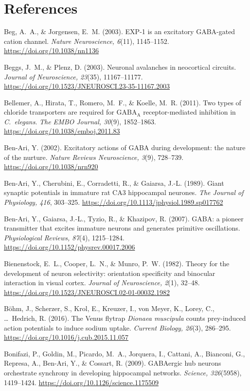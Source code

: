 \documentclass[11pt,a4paper]{article}
\newenvironment{apabib}{\raggedright\begin{list}{}{%
  \setlength{\leftmargin}{1.6em}\setlength{\itemindent}{-1.6em}%
  \setlength{\itemsep}{3pt}\setlength{\parsep}{0pt}\setlength{\topsep}{4pt}}}%
  {\end{list}}
\begin{document}
\section*{References}
\small
\begin{apabib}
\item Beg, A.~A., \& Jorgensen, E.~M. (2003). EXP-1 is an excitatory GABA-gated cation channel. \emph{Nature Neuroscience, 6}(11), 1145--1152. \url{https://doi.org/10.1038/nn1136}
\item Beggs, J.~M., \& Plenz, D. (2003). Neuronal avalanches in neocortical circuits. \emph{Journal of Neuroscience, 23}(35), 11167--11177. \url{https://doi.org/10.1523/JNEUROSCI.23-35-11167.2003}
\item Bellemer, A., Hirata, T., Romero, M.~F., \& Koelle, M.~R. (2011). Two types of chloride transporters are required for GABA$_{\mathrm{A}}$ receptor-mediated inhibition in \emph{C.~elegans}. \emph{The EMBO Journal, 30}(9), 1852--1863. \url{https://doi.org/10.1038/emboj.2011.83}
\item Ben-Ari, Y. (2002). Excitatory actions of GABA during development: the nature of the nurture. \emph{Nature Reviews Neuroscience, 3}(9), 728--739. \url{https://doi.org/10.1038/nrn920}
\item Ben-Ari, Y., Cherubini, E., Corradetti, R., \& Gaiarsa, J.-L. (1989). Giant synaptic potentials in immature rat CA3 hippocampal neurones. \emph{The Journal of Physiology, 416}, 303--325. \url{https://doi.org/10.1113/jphysiol.1989.sp017762}
\item Ben-Ari, Y., Gaiarsa, J.-L., Tyzio, R., \& Khazipov, R. (2007). GABA: a pioneer transmitter that excites immature neurons and generates primitive oscillations. \emph{Physiological Reviews, 87}(4), 1215--1284. \url{https://doi.org/10.1152/physrev.00017.2006}
\item Bienenstock, E.~L., Cooper, L.~N., \& Munro, P.~W. (1982). Theory for the development of neuron selectivity: orientation specificity and binocular interaction in visual cortex. \emph{Journal of Neuroscience, 2}(1), 32--48. \url{https://doi.org/10.1523/JNEUROSCI.02-01-00032.1982}
\item B\"ohm, J., Scherzer, S., Krol, E., Kreuzer, I., von Meyer, K., Lorey, C., \ldots\ Hedrich, R. (2016). The Venus flytrap \emph{Dionaea muscipula} counts prey-induced action potentials to induce sodium uptake. \emph{Current Biology, 26}(3), 286--295. \url{https://doi.org/10.1016/j.cub.2015.11.057}
\item Bonifazi, P., Goldin, M., Picardo, M.~A., Jorquera, I., Cattani, A., Bianconi, G., Represa, A., Ben-Ari, Y., \& Cossart, R. (2009). GABAergic hub neurons orchestrate synchrony in developing hippocampal networks. \emph{Science, 326}(5958), 1419--1424. \url{https://doi.org/10.1126/science.1175509}

\end{apabib}
\end{document}
